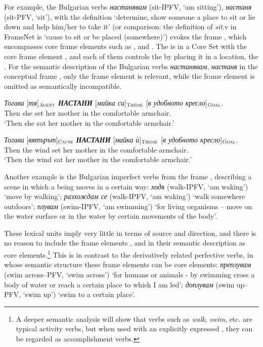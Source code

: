 \documentclass[output=paper,colorlinks,citecolor=brown]{langscibook}
\begin{document}
For example, the Bulgarian verbs \textit{настанявам} (sit-IPFV, `am sitting'), \textit{настаня} (sit-PFV, `sit'), with the definition `determine, show someone a place to sit or lie down and help him/her to take it' (or comparison: the definition of \textit{sit}.v in FrameNet is `cause to sit or be placed (somewhere)') evokes the frame , which encompasses core frame elements such as ,  and . The  is in a Core Set with the core frame element , and each of them controls the  by placing it in a location, the .
For the semantic description of the Bulgarian verbs \textit{настанявам}, \textit{настаня} in the conceptual frame , only the frame element  is relevant, while the frame element  is omitted as semantically incompatible.

 \begin{exe}
 \ex  \label{ch01:ex:05}
 \gll \textit{Тогава}  [\textit{тя}]$_{\text{\textsc{Agent}}}$   \textit{\textbf{НАСТАНИ}}  [\textit{майка си}]$_{\text{\textsc{Theme}}}$  [\textit{в удобното кресло}]$_{\text{\textsc{Goal}}}$.\\
 Then {she}  set {her mother} {in the comfortable armchair}. \\
 \glt `Then she sat her mother in the comfortable armchair.' 
 \end{exe}
 
\begin{exe}
 \ex  \label{ch01:ex:06}
\gll *\textit{Тогава} [\textit{вятърът}]$_{\text{\textsc{Cause}}}$  \textit{\textbf{НАСТАНИ}} [\textit{майка ѝ}]$_{\text{\textsc{Theme}}}$  [\textit{в удобното кресло}]$_{\text{\textsc{Goal}}}$.\\
Then {the wind}  set {her mother} {in the comfortable armchair}. \\
\glt `{Then the wind sat her mother in the comfortable armchair}.' 
\end{exe}

 
Another example is the Bulgarian imperfect verbs from the frame , describing a scene in which a being moves in a certain way: \textit{ходя} (walk-IPFV, `am waking') `move by walking';  \textit{разхождам се} (walk-IPFV, `am waking') `walk somewhere outdoors'; \textit{плувам} (swim-IPFV, `am swimming') `for living organisms -- move on the water surface or in the water by certain movements of the body'.

These lexical units imply very little in terms of source and direction, and there is no reason to include the frame elements ,   and  in their semantic description as core elements.\footnote{A deeper semantic analysis will show that verbs such as \textit{walk}, \textit{swim}, etc. are typical activity verbs, but when used with an explicitly expressed , they can be regarded as  accomplishment verbs.} This is in contrast to the derivatively related perfective verbs, in whose semantic structure these frame elements can be core elements: \textit{преплувам} (swim across--PFV, `swim across')  `for humans or animals - by swimming cross a body of water or reach a certain place to which I am led'; \textit{доплувам} (swim up--PFV, `swim up') `swim to a certain place'.
\end{document}
